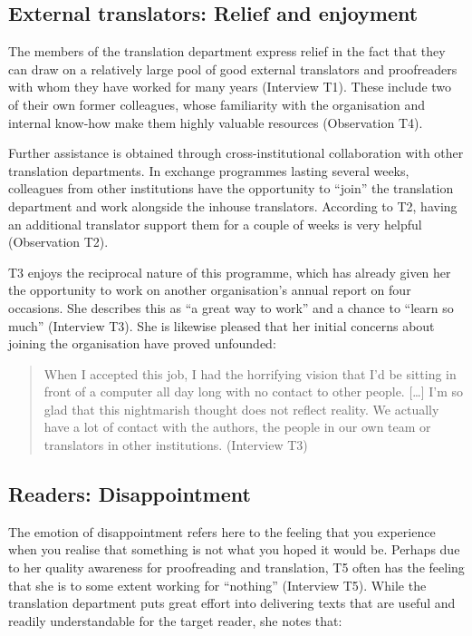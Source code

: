 \documentclass[output=paper]{langscibook}
\begin{document}
\subsection{External translators: Relief and enjoyment}

The members of the translation department express relief in the fact that they can draw on a relatively large pool of good external translators and proofreaders with whom they have worked for many years (Interview T1). These include two of their own former colleagues, whose familiarity with the organisation and internal know-how make them highly valuable resources (Observation T4).

Further assistance is obtained through cross-institutional collaboration with other translation departments. In exchange programmes lasting several weeks, colleagues from other institutions have the opportunity to “join” the translation department and work alongside the inhouse translators. According to T2, having an additional translator support them for a couple of weeks is very helpful (Observation T2).

T3 enjoys the reciprocal nature of this programme, which has already given her the opportunity to work on another organisation’s annual report on four occasions. She describes this as “a great way to work” and a chance to “learn so much” (Interview T3). She is likewise pleased that her initial concerns about joining the organisation have proved unfounded:

\begin{quote}
    When I accepted this job, I had the horrifying vision that I’d be sitting in front of a computer all day long with no contact to other people. […] I'm so glad that this nightmarish thought does not reflect reality. We actually have a lot of contact with the authors, the people in our own team or translators in other institutions. (Interview T3)
\end{quote}

\subsection{Readers: Disappointment}

The emotion of disappointment refers here to the feeling that you experience when you realise that something is not what you hoped it would be. Perhaps due to her quality awareness for proofreading and translation, T5 often has the feeling that she is to some extent working for “nothing” (Interview T5). While the translation department puts great effort into delivering texts that are useful and readily understandable for the target reader, she notes that:
\end{document}
